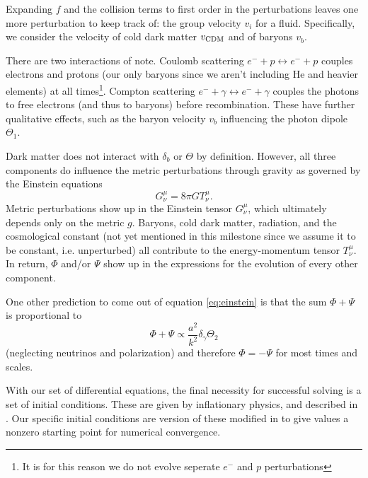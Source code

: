 \documentclass[aps,prl,twocolumn,groupedaddress,nofootinbib]{revtex4-2}
\begin{document}
Expanding $f$ and the collision terms to first order in the perturbations leaves one more perturbation to keep track of: the group velocity $v_i$ for a fluid. Specifically, we consider the velocity of cold dark matter $v_{\rm{CDM}}$ and of baryons $v_b$.

There are two interactions of note. Coulomb scattering $e^- + p \leftrightarrow e^- + p$ couples electrons and protons (our only baryons since we aren't including He and heavier elements) at all times\footnote{It is for this reason we do not evolve seperate $e^-$ and $p$ perturbations}. Compton scattering $e^-+\gamma \leftrightarrow e^- +\gamma$ couples the photons to free electrons (and thus to baryons) before recombination. These have further qualitative effects, such as the baryon velocity $v_b$ influencing the photon dipole $\Theta_1$.

Dark matter does not interact with $\delta_b$ or $\Theta$ by definition. However, all three components do influence the metric perturbations through gravity as governed by the Einstein equations
\begin{equation*}
    G^\mu_\nu=8\pi GT^\mu_\nu.
    \label{eq:einstein}
\end{equation*}
Metric perturbations show up in the Einstein tensor $G^\mu_\nu$, which ultimately depends only on the metric $g$. Baryons, cold dark matter, radiation, and the cosmological constant (not yet mentioned in this milestone since we assume it to be constant, i.e. unperturbed) all contribute to the energy-momentum tensor $T^\mu_\nu$. In return, $\Phi$ and/or $\Psi$ show up in the expressions for the evolution of every other component.

One other prediction to come out of equation \ref{eq:einstein} is that the sum $\Phi+\Psi$ is proportional to
\begin{equation}
    \Phi+\Psi \propto \frac{a^2}{k^2}\delta_\gamma\Theta_2
    \label{eq:pot_cancel}
\end{equation}
(neglecting neutrinos and polarization) and therefore $\Phi=-\Psi$ for most times and scales.

With our set of differential equations, the final necessity for successful solving is a set of initial conditions. These are given by inflationary physics, and described in \citet{Dodelson_Schmidt_2026}. Our specific initial conditions are version of these modified in \citet{callin_how_2006} to give values a nonzero starting point for numerical convergence.
\end{document}
